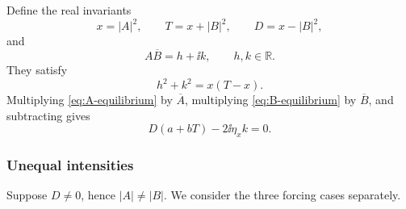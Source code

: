 Define the real invariants
\[
 x=|A|^2,
 \qquad
 T=x+|B|^2,
 \qquad
 D=x-|B|^2,
\]
and
\[
 A\overline B=h+\ii k,
 \qquad
 h,k\in\mathbb R.
\]
They satisfy
\begin{equation}
 h^2+k^2=x(T-x).
 \label{eq:relative-phase-constraint}
\end{equation}
Multiplying \eqref{eq:A-equilibrium} by $\overline A$, multiplying
\eqref{eq:B-equilibrium} by $\overline B$, and subtracting gives
\begin{equation}
 D(a+bT)-2\ii\eta_xk=0.
 \label{eq:difference-balance}
\end{equation}

\subsubsection{Unequal intensities}

Suppose $D\neq0$, hence $|A|\neq|B|$.  We consider the three forcing cases
separately.

